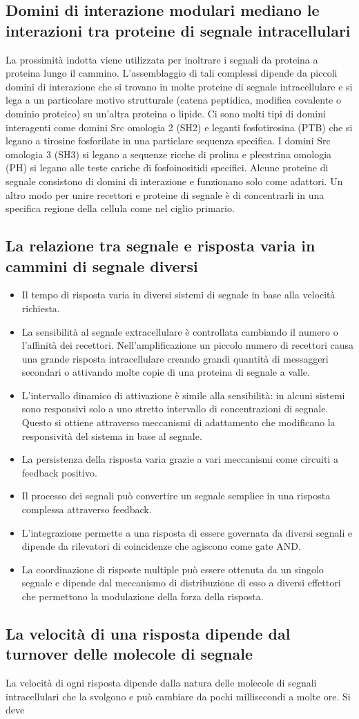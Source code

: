 \subsection{Domini di interazione modulari mediano le interazioni tra proteine di segnale intracellulari}
La prossimit\`a indotta viene utilizzata per inoltrare i segnali da proteina a proteina lungo il cammino. L'assemblaggio di tali complessi dipende da piccoli domini di interazione che
si trovano in molte proteine di segnale intracellulare e si lega a un particolare motivo strutturale (catena peptidica, modifica covalente o dominio proteico) su un'altra proteina o 
lipide. Ci sono molti tipi di domini interagenti come domini Src omologia 2 (SH2) e leganti fosfotirosina (PTB) che si legano a tirosine fosforilate in una particlare sequenza specifica.
I domini Src omologia 3 (SH3) si legano a sequenze ricche di prolina e plecstrina omologia (PH) si legano alle teste cariche di fosfoinositidi specifici. Alcune proteine di segnale 
consistono di domini di interazione e funzionano solo come adattori. Un altro modo per unire recettori e proteine di segnale \`e di concentrarli in una specifica regione della cellula
come nel ciglio primario. 
\subsection{La relazione tra segnale e risposta varia in cammini di segnale diversi}
\begin{itemize}
	\item Il tempo di risposta varia in diversi sistemi di segnale in base alla velocit\`a richiesta.
	\item La sensibilit\`a al segnale extracellulare \`e controllata cambiando il numero o l'affinit\`a dei recettori. Nell'amplificazione un piccolo numero di recettori causa
		una grande risposta intracellulare creando grandi quantit\`a di messaggeri secondari o attivando molte copie di una proteina di segnale a valle.
	\item L'intervallo dinamico di attivazione \`e simile alla sensibilit\`a: in alcuni sistemi sono responsivi solo a uno stretto intervallo di concentrazioni di segnale. Questo
		si ottiene attraverso meccanismi di adattamento che modificano la responsivit\`a del sistema in base al segnale.
	\item La persistenza della risposta varia grazie a vari meccanismi come circuiti a feedback positivo.
	\item Il processo dei segnali pu\`o convertire un segnale semplice in una risposta complessa attraverso feedback.
	\item L'integrazione permette a una risposta di essere governata da diversi segnali e dipende da rilevatori di coincidenze che agiscono come gate AND.
	\item La coordinazione di risposte multiple pu\`o essere ottenuta da un singolo segnale e dipende dal meccanismo di distribuzione di esso a diversi effettori che permettono la
		modulazione della forza della risposta.
\end{itemize}
\subsection{La velocit\`a di una risposta dipende dal turnover delle molecole di segnale}
La velocit\`a di ogni risposta dipende dalla natura delle molecole di segnali intracellulari che la svolgono e pu\`o cambiare da pochi millisecondi a molte ore. Si deve
